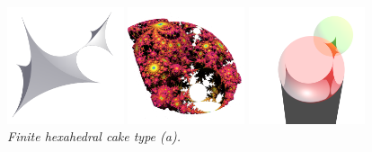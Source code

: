 \documentclass[suppldata, dvipdfmx]{interact}
\theoremstyle{plain}%
\theoremstyle{definition}
\theoremstyle{remark}
\theoremstyle{problemstyle}
\begin{document}
\begin{figure}[H]
 \begin{minipage}{0.5\textwidth}
  \begin{minipage}[t]{0.24\textwidth}
   \centering \includegraphics[width=1.35in, height=1.35in,
   keepaspectratio]{./img/sphairahedron/hexahedralCake3/sphairahedronFinite_a.png}
  \end{minipage}
  \hspace*{\fill}
  \begin{minipage}[t]{0.24\textwidth}
   \centering
   \includegraphics[width=1.35in, height=1.35in,
   keepaspectratio]{./img/sphairahedron/hexahedralCake3/limitsetFinite_a.png}
  \end{minipage}
  \hspace*{\fill}
  \caption{\textit{Finite hexahedral cake type (a).}}
  \label{}
 \end{minipage}
 \hspace*{\fill}
 \begin{minipage}{0.5\textwidth}
  \begin{minipage}[t]{0.24\textwidth}
   \centering
   \includegraphics[width=1.35in, height=1.35in,
   keepaspectratio]{./img/sphairahedron/hexahedralCake3/sphairahedralPrismInf_a.png}
  \end{minipage}
  \hspace*{\fill}

\end{minipage}
\end{figure}
\end{document}
